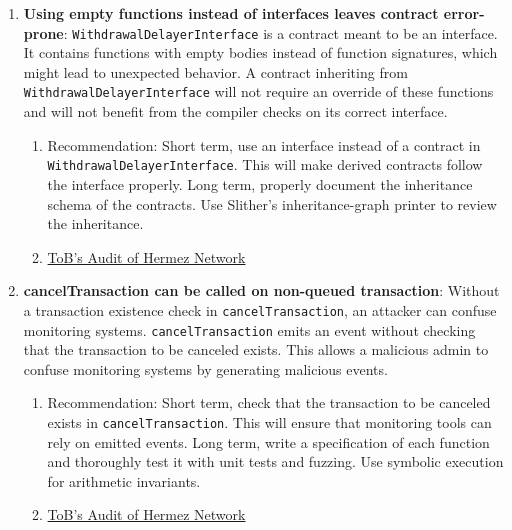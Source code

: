 \begin{enumerate}
\item\textbf{Using empty functions instead of interfaces leaves contract error-prone}: \verb|WithdrawalDelayerInterface| is a contract meant to be an interface. It contains functions with empty bodies instead of function signatures, which might lead to unexpected behavior. A contract inheriting from \verb|WithdrawalDelayerInterface| will not require an override of these functions and will not benefit from the compiler checks on its correct interface.
	\begin{enumerate}
	\item Recommendation: Short term, use an interface instead of a contract in \verb|WithdrawalDelayerInterface|. This will make derived contracts follow the interface properly. Long term, properly document the inheritance schema of the contracts. Use Slither’s inheritance-graph printer to review the inheritance.
	\item\href{https://github.com/trailofbits/publications/blob/master/reviews/hermez.pdf}{ToB's Audit of Hermez Network}
	\end{enumerate}

\item\textbf{cancelTransaction can be called on non-queued transaction}: Without a transaction existence check in \verb|cancelTransaction|, an attacker can confuse monitoring systems. \verb|cancelTransaction| emits an event without checking that the transaction to be canceled exists. This allows a malicious admin to confuse monitoring systems by generating malicious events.
	\begin{enumerate}
	\item Recommendation: Short term, check that the transaction to be canceled exists in \verb|cancelTransaction|. This will ensure that monitoring tools can rely on emitted events. Long term, write a specification of each function and thoroughly test it with unit tests and fuzzing. Use symbolic execution for arithmetic invariants.
	\item\href{https://github.com/trailofbits/publications/blob/master/reviews/hermez.pdf}{ToB's Audit of Hermez Network}
	\end{enumerate}


\end{enumerate}
